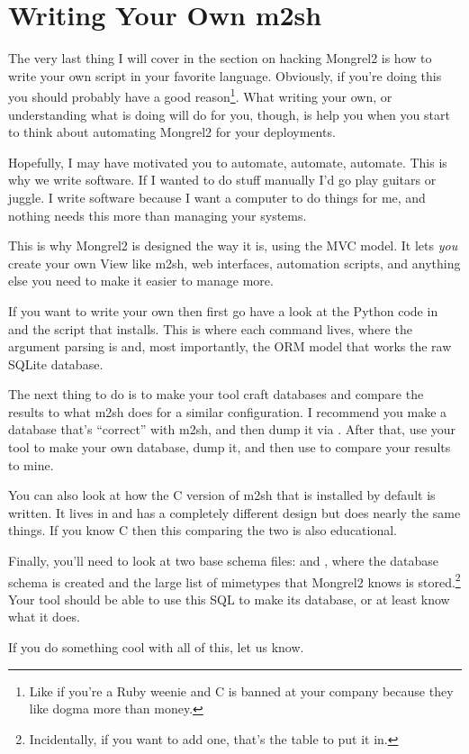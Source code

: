 \section{Writing Your Own m2sh}

The very last thing I will cover in the section on hacking Mongrel2 is how to
write your own  script in your favorite language.  Obviously, if
you're doing this you should probably have a good reason\footnote{Like if
you're a Ruby weenie and C is banned at your company because they like
dogma more than money.}.  What writing your own, or understanding what
 is doing will do for you, though, is help you when you start to
think about automating Mongrel2 for your deployments.

Hopefully, I may have motivated you to automate, automate, automate.
This is why we write software.  If I wanted to do stuff manually I'd
go play guitars or juggle.  I write software because I want a computer
to do things for me, and nothing needs this more than managing your systems.

This is why Mongrel2 is designed the way it is, using the MVC model.  It
lets \emph{you} create your own View like m2sh, web interfaces, automation
scripts, and anything else you need to make it easier to manage more.

If you want to write your own  then first go have a look at the
Python code in  and the  script that
installs.  This is where each command lives, where the argument parsing is and,
most importantly, the ORM model that works the raw SQLite database.

The next thing to do is to make your tool craft databases and compare the
results to what m2sh does for a similar configuration.  I recommend you make
a database that's ``correct'' with m2sh, and then dump it via .
After that, use your tool to make your own database, dump it, and then use
 to compare your results to mine.

You can also look at how the C version of m2sh that is installed by default
is written.  It lives in  and has a completely different
design but does nearly the same things.  If you know C then this comparing
the two is also educational.

Finally, you'll need to look at two base schema files:
 and , where
the database schema is created and the large list of mimetypes that
Mongrel2 knows is stored.\footnote{Incidentally, if you want to add one,
that's the table to put it in.}  Your tool should be able to use this
SQL to make its database, or at least know what it does.

If you do something cool with all of this, let us know.

